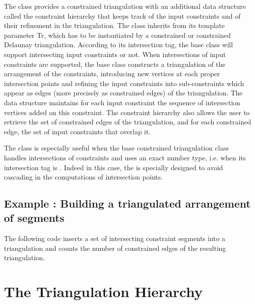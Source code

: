 The class 
provides a constrained triangulation with an additional data
structure called the  constraint hierarchy 
that keeps track of  the input constraints and of their refinement
in the triangulation.
The class 
inherits from its template parameter Tr, which has to be instantiated
by a constrained  or constrained Delaunay  triangulation.
According to its intersection tag, the base class
will support intersecting input constraints or not.
When intersections of input constraints are supported,
the base class constructs a triangulation  of the  arrangement
of the constraints,
introducing new vertices at each proper intersection
points and  refining the input constraints into sub-constraints
which appear as  edges (more precisely as constrained edges) of the
triangulation.  The  data structure maintains for each 
input constraint
the sequence of intersection vertices added on this constraint.
The constraint hierarchy also allows the user to retrieve the set
of constrained edges of the triangulation, and for each
constrained edge,  the set of input constraints that overlap it.

The class 
is especially useful when the base constrained triangulation class
handles intersections of constraints and uses an exact number type,
i.e. when its intersection tag is .
Indeed in this case, the 
is specially designed to avoid cascading in the computations of
intersection  points.

\subsection{Example : Building a triangulated arrangement of segments}

The following code inserts a set of intersecting constraint segments
into a triangulation 
and counts the number of constrained edges of the
resulting triangulation.






\section{The Triangulation Hierarchy\label{Section_2D_Triangulations_Hierarchy}}


